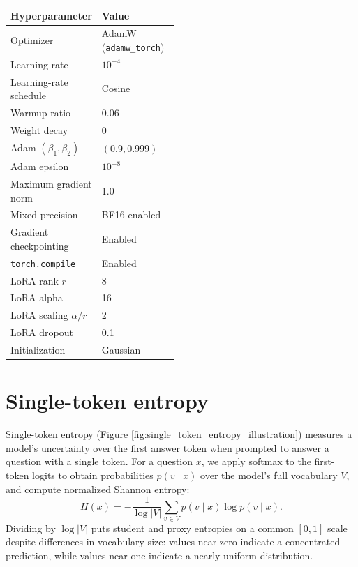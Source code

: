 \documentclass[11pt]{article}
\begin{document}
\begin{center}
  \small
  \begin{tabularx}{\linewidth}{@{}p{0.48\linewidth}X@{}}
    \toprule
    Hyperparameter & Value \\
    \midrule
    Optimizer & AdamW (\texttt{adamw\_torch}) \\
    Learning rate & $10^{-4}$ \\
    Learning-rate schedule & Cosine \\
    Warmup ratio & 0.06 \\
    Weight decay & 0 \\
    Adam $(\beta_1,\beta_2)$ & $(0.9,0.999)$ \\
    Adam epsilon & $10^{-8}$ \\
    Maximum gradient norm & 1.0 \\
    Mixed precision & BF16 enabled \\
    Gradient checkpointing & Enabled \\
    \texttt{torch.compile} & Enabled \\
    LoRA rank $r$ & 8 \\
    LoRA alpha & 16 \\
    LoRA scaling $\alpha/r$ & 2 \\
    LoRA dropout & 0.1 \\
    Initialization & Gaussian \\
    \bottomrule
  \end{tabularx}
\end{center}

\section{Single-token entropy}

Single-token entropy (Figure \ref{fig:single_token_entropy_illustration}) measures a model's uncertainty over the first answer token when prompted to answer a question with a single token.
For a question $x$, we apply softmax to the first-token logits to obtain probabilities $p(v\mid x)$ over the model's full vocabulary $V$, and compute normalized Shannon entropy:
\begin{equation}
  H(x) = -\frac{1}{\log |V|}\sum_{v\in V} p(v\mid x)\log p(v\mid x).
\end{equation}
Dividing by $\log |V|$ puts student and proxy entropies on a common $[0,1]$ scale despite differences in vocabulary size: values near zero indicate a concentrated prediction, while values near one indicate a nearly uniform distribution.
\end{document}
